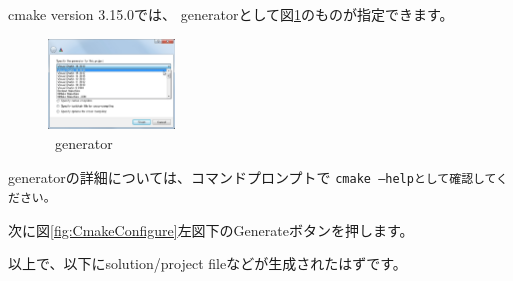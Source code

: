 \begin{narrow}[15pt]
	\medskip
	cmake version 3.15.0では、
	generatorとして図\ref{fig:CmakeGenerator}のものが指定できます。

	\begin{figure}[h]
	\begin{center}
	\includegraphics[width=0.3\textwidth]{fig/CmakeConfigure4.eps}
	\end{center}
	\caption{\cmake\ generator}
	\label{fig:CmakeGenerator}
	\end{figure}
	generatorの詳細については、コマンドプロンプトで
	\tt{cmake --help}として確認してください。

	次に図\ref{fig:CmakeConfigure}左図下のGenerateボタンを押します。
\end{narrow}

以上で、\build 以下にsolution/project fileなどが生成されたはずです。

